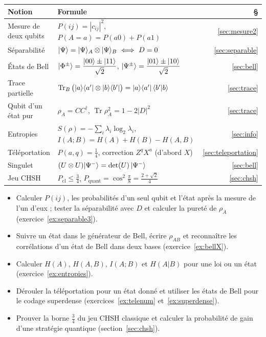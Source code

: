 \begin{center}
\renewcommand{\arraystretch}{1.2}
\begin{tabular}{@{}l l r@{}}
\toprule
\textbf{Notion} & \textbf{Formule} & \textbf{§} \\
\midrule
Mesure de deux qubits & $P(ij)=|c_{ij}|^2$, \quad $P(A{=}a)=P(a0)+P(a1)$ & \ref{sec:mesure2} \\
Séparabilité & $\ket{\Psi}=\ket{\Psi}_A\otimes\ket{\Psi}_B\ \Longleftrightarrow\ D=0$ & \ref{sec:separable} \\
États de Bell & $|\Phi^\pm\rangle=\dfrac{|00\rangle\pm|11\rangle}{\sqrt2}$, \quad
  $|\Psi^\pm\rangle=\dfrac{|01\rangle\pm|10\rangle}{\sqrt2}$ & \ref{sec:bell} \\
Trace partielle & $\operatorname{Tr}_B\big(|a\rangle\langle a'|\otimes|b\rangle\langle b'|\big)
  =|a\rangle\langle a'|\,\langle b'|b\rangle$ & \ref{sec:trace} \\
Qubit d'un état pur & $\rho_A=CC^\dagger$, \quad $\operatorname{Tr}\rho_A^2=1-2|D|^2$ & \ref{sec:trace} \\
Entropies & $S(\rho)=-\sum_i\lambda_i\log_2\lambda_i$, \quad $I(A;B)=H(A)+H(B)-H(A,B)$ & \ref{sec:info} \\
Téléportation & $P(a,q)=\frac14$, \quad correction $Z^{q}X^{a}$ (d'abord $X$) & \ref{sec:teleportation} \\
Singulet & $(U\otimes U)|\Psi^-\rangle=\det(U)\,|\Psi^-\rangle$ & \ref{sec:bell} \\
Jeu CHSH & $P_{\mathrm{cl}}\leq\frac34$, \quad $P_{\mathrm{quant}}=\cos^2\frac\pi8=\frac{2+\sqrt2}{4}$ & \ref{sec:chsh} \\
\bottomrule
\end{tabular}
\end{center}

\begin{savoirfaire}
\begin{itemize}
  \item Calculer $P(ij)$, les probabilités d'un seul qubit et l'état après la mesure de l'un d'eux ;
        tester la séparabilité avec $D$ et calculer la pureté de $\rho_A$ (exercice~\ref{ex:separable3}).
  \item Suivre un état dans le générateur de Bell, écrire $\rho_{AB}$ et reconnaître les corrélations
        d'un état de Bell dans deux bases (exercice~\ref{ex:bellX}).
  \item Calculer $H(A)$, $H(A,B)$, $I(A;B)$ et $H(A|B)$ pour une loi ou un état (exercice~\ref{ex:entropies}).
  \item Dérouler la téléportation pour un état donné et utiliser les états de Bell pour le codage
        superdense (exercices~\ref{ex:telenum} et~\ref{ex:superdense}).
  \item Prouver la borne $\frac34$ du jeu CHSH classique et calculer la probabilité de gain d'une
        stratégie quantique (section~\ref{sec:chsh}).
\end{itemize}
\end{savoirfaire}
